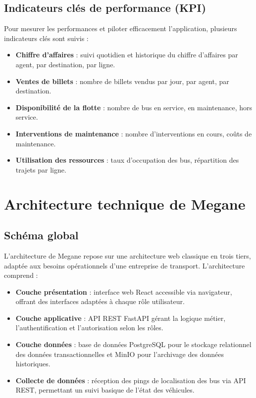 \documentclass[a4paper, 12pt]{book}
\begin{document}
\subsection{Indicateurs clés de performance (KPI)}

Pour mesurer les performances et piloter efficacement l'application, plusieurs indicateurs clés sont suivis :

\begin{itemize}
    \item \textbf{Chiffre d'affaires} : suivi quotidien et historique du chiffre d'affaires par agent, par destination, par ligne.
    \item \textbf{Ventes de billets} : nombre de billets vendus par jour, par agent, par destination.
    \item \textbf{Disponibilité de la flotte} : nombre de bus en service, en maintenance, hors service.
    \item \textbf{Interventions de maintenance} : nombre d'interventions en cours, coûts de maintenance.
    \item \textbf{Utilisation des ressources} : taux d'occupation des bus, répartition des trajets par ligne.
\end{itemize}

\section{Architecture technique de Megane}

\subsection{Schéma global}

L'architecture de Megane repose sur une architecture web classique en trois tiers, adaptée aux besoins opérationnels d'une entreprise de transport. L'architecture comprend :

\begin{itemize}
    \item \textbf{Couche présentation} : interface web React accessible via navigateur, offrant des interfaces adaptées à chaque rôle utilisateur.
    \item \textbf{Couche applicative} : API REST FastAPI gérant la logique métier, l'authentification et l'autorisation selon les rôles.
    \item \textbf{Couche données} : base de données PostgreSQL pour le stockage relationnel des données transactionnelles et MinIO pour l'archivage des données historiques.
    \item \textbf{Collecte de données} : réception des pings de localisation des bus via API REST, permettant un suivi basique de l'état des véhicules.
\end{itemize}
\end{document}
